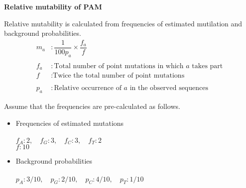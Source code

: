 \question \textbf{Relative mutability of PAM}

Relative mutability is calculated from frequencies of estimated mutilation and background probabilities.
\begin{align*}
m_a &:  \dfrac{1}{100p_a}  \times \dfrac{f_a}{f} \\ \\
f_a &:  \text{Total number of point mutations in which } a \text{ takes part}  \\
f &:  \text{Twice the total number of point mutations} \\ \\
p_a &: \text{Relative occurrence of } a \text{ in the observed sequences}
\end{align*}

\noindent
Assume that the frequencies are pre-calculated as follows.
\begin{itemize}
\item Frequencies of estimated mutations \\ \\
 $f_A: 2, \quad f_G: 3, \quad f_C: 3, \quad f_T: 2$ \\
 $f: 10$ \\

\item Background probabilities \\ \\
 $p_A: 3/10, \quad p_G: 2/10, \quad p_C: 4/10, \quad p_T: 1/10 $
 
\end{itemize}

